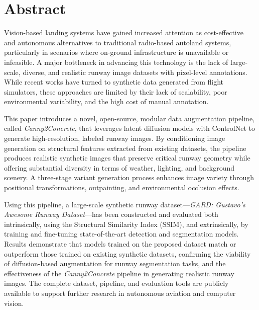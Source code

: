 \begingroup

\chapter*{Abstract}

Vision-based landing systems have gained increased attention as cost-effective and autonomous alternatives 
to traditional radio-based autoland systems, particularly in scenarios where on-ground infrastructure is 
unavailable or infeasible. A major bottleneck in advancing this technology is the lack of large-scale, diverse, 
and realistic runway image datasets with pixel-level annotations. While recent works have turned to synthetic 
data generated from flight simulators, these approaches are limited by their lack of scalability, poor 
environmental variability, and the high cost of manual annotation.

This paper introduces a novel, open-source, modular data augmentation pipeline, called \emph{Canny2Concrete}, 
that leverages latent diffusion models with ControlNet to generate high-resolution, labeled runway images. 
By conditioning image generation on structural features extracted from existing datasets, the pipeline produces 
realistic synthetic images that preserve critical runway geometry while offering substantial diversity in terms 
of weather, lighting, and background scenery. A three-stage variant generation process enhances image variety 
through positional transformations, outpainting, and environmental occlusion effects.

Using this pipeline, a large-scale synthetic runway dataset---\emph{GARD: Gustavo's Awesome Runway Dataset}---has 
been constructed and evaluated both intrinsically, using the Structural Similarity Index (SSIM), and extrinsically, 
by training and fine-tuning state-of-the-art detection and segmentation models. Results demonstrate that models 
trained on the proposed dataset match or outperform those trained on existing synthetic datasets, confirming 
the viability of diffusion-based augmentation for runway segmentation tasks, and the effectiveness of the
\emph{Canny2Concrete} pipeline in generating realistic runway images. The complete dataset, pipeline, and 
evaluation tools are publicly available to support further research in autonomous aviation and computer vision.

